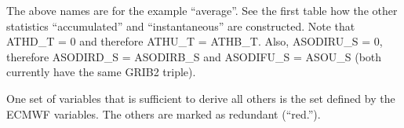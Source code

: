 \documentclass[11pt,notitlepage]{article}  %
\begin{document}
The above names are for the example ``average''.  See the first table how the other statistics ``accumulated'' and ``instantaneous'' are constructed.
Note that ATHD\_T = 0 and therefore ATHU\_T = ATHB\_T.  Also, ASODIRU\_S = 0, therefore ASODIRD\_S = ASODIRB\_S and ASODIFU\_S = ASOU\_S (both currently
have the same GRIB2 triple).

One set of variables that is sufficient to derive all others is the set defined by the ECMWF variables.  The others are marked 
as redundant (``red.'').
\end{document}
